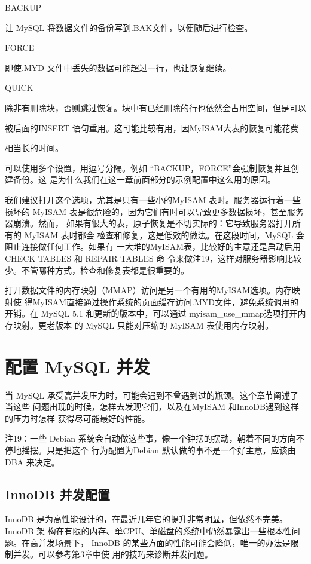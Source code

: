 BACKUP

让 MySQL 将数据文件的备份写到.BAK文件，以便随后进行检查。

FORCE

即使.MYD 文件中丢失的数据可能超过一行，也让恢复继续。

QUICK

除非有删除块，否则跳过恢复。块中有已经删除的行也依然会占用空间，但是可以

被后面的INSERT 语句重用。这可能比较有用，因MyISAM大表的恢复可能花费

相当长的时间。

可以使用多个设置，用逗号分隔。例如 “BACKUP，FORCE”会强制恢复并且创建备份。这
是为什么我们在这一章前面部分的示例配置中这么用的原因。

我们建议打开这个选项，尤其是只有一些小的MyISAM 表时。服务器运行着一些损坏的
MyISAM 表是很危险的，因为它们有时可以导致更多数据损坏，甚至服务器崩溃。然而，
如果有很大的表，原子恢复是不切实际的：它导致服务器打开所有的 MyISAM 表时都会
检查和修复，这是低效的做法。在这段时间，MySQL 会阻止连接做任何工作。如果有
一大堆的MyISAM表，比较好的主意还是启动后用 CHECK TABLES 和 REPAIR TABLES 命
令来做注19，这样对服务器影响比较少。不管哪种方式，检查和修复表都是很重要的。

打开数据文件的内存映射（MMAP）访问是另一个有用的MyISAM选项。内存映射使
得MyISAM直接通过操作系统的页面缓存访问.MYD文件，避免系统调用的开销。在
MySQL 5.1 和更新的版本中，可以通过 myisam\_use\_mmap选项打开内存映射。更老版本
的 MySQL 只能对压缩的 MyISAM 表使用内存映射。

\section{配置 MySQL 并发}
当 MySQL 承受高并发压力时，可能会遇到不曾遇到过的瓶颈。这个章节阐述了当这些
问题出现的时候，怎样去发现它们，以及在MyISAM 和InnoDB遇到这样的压力时怎样
获得尽可能最好的性能。

注19：一些 Debian 系统会自动做这些事，像一个钟摆的摆动，朝着不同的方向不停地摇摆。只是把这个
行为配置为Debian 默认做的事不是一个好主意，应该由 DBA 来决定。

\subsection{InnoDB 并发配置}
InnoDB 是为高性能设计的，在最近几年它的提升非常明显，但依然不完美。InnoDB 架
构在有限的内存、单CPU、单磁盘的系统中仍然暴露出一些根本性问题。在高并发场景下，
InnoDB 的某些方面的性能可能会降低，唯一的办法是限制并发。可以参考第3章中使
用的技巧来诊断并发问题。

